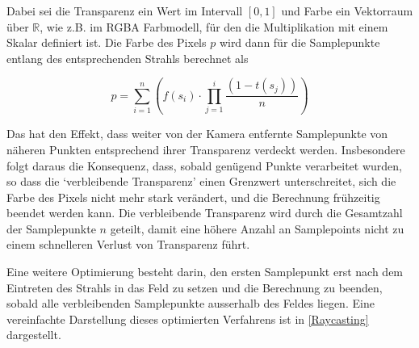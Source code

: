 \documentclass[a4paper,fontsize=12pt,toc=bib,halfparskip]{scrartcl}
\begin{document}
Dabei sei die Transparenz ein Wert im Intervall $[0,1]$ und Farbe ein Vektorraum \"uber $\mathbb{R}$, wie z.B. im RGBA Farbmodell, f\"ur den die Multiplikation mit einem Skalar definiert ist. Die Farbe des Pixels $p$ wird dann f\"ur die Samplepunkte entlang des entsprechenden Strahls berechnet als

\begin{equation}
	p = \sum_{i=1}^{n} \left(f(s_i) \cdot \prod_{j=1}^{i} \frac{(1-t(s_j))}{n}\right)
	\label{RaycastingFormula}
\end{equation}

Das hat den Effekt, dass weiter von der Kamera entfernte Samplepunkte von n\"aheren Punkten entsprechend ihrer Transparenz verdeckt werden. Insbesondere folgt daraus die Konsequenz, dass, sobald gen\"ugend Punkte verarbeitet wurden, so dass die `verbleibende Transparenz' einen Grenzwert unterschreitet, sich die Farbe des Pixels nicht mehr stark ver\"andert, und die Berechnung fr\"uhzeitig beendet werden kann. Die verbleibende Transparenz wird durch die Gesamtzahl der Samplepunkte $n$ geteilt, damit eine h\"ohere Anzahl an Samplepoints nicht zu einem schnelleren Verlust von Transparenz f\"uhrt.

Eine weitere Optimierung besteht darin, den ersten Samplepunkt erst nach dem Eintreten des Strahls in das Feld zu setzen und die Berechnung zu beenden, sobald alle verbleibenden Samplepunkte ausserhalb des Feldes liegen. Eine vereinfachte Darstellung dieses optimierten Verfahrens ist in \ref{Raycasting} dargestellt.
 
\end{document}
